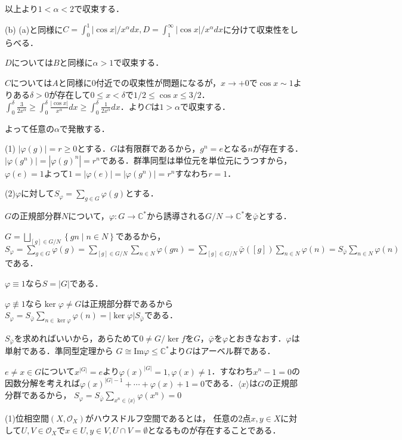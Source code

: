 \documentclass[
		book,
		head_space=20mm,
		foot_space=20mm,
		gutter=10mm,
		line_length=190mm
]{jlreq}
\begin{document}
以上より$1<\alpha<2$で収束する．

(b) (a)と同様に$C=\int_0^1 |\cos x|/x^\alpha dx,D=\int_1^\infty |\cos x|/x^\alpha dx$に分けて収束性をしらべる．

$D$については$B$と同様に$\alpha>1$で収束する．

$C$については$A$と同様に$0$付近での収束性が問題になるが，$x\to +0$で$\cos x \sim 1$よりある$\delta>0$が存在して$0\le x < \delta$で$1/2 \le \cos x \le 3/2$．
$\int_0^{\delta} \frac{3}{2x^{\alpha}}\ge \int_0^{\delta} \frac{|\cos x|}{x^{\alpha}} dx \ge \int_0^{\delta} \frac{1}{2x^{\alpha}} dx$．より$C$は$1>\alpha$で収束する．

よって任意の$\alpha$で発散する．

(1) $|\varphi(g)|=r\ge0$とする．$G$は有限群であるから，$g^n=e$となる$n$が存在する．$|\varphi(g^n)|=|\varphi(g)^n|=r^n$である．群準同型は単位元を単位元にうつすから，$\varphi(e)=1$よって$1=|\varphi(e)|=|\varphi(g^n)|=r^n$すなわち$r=1$．

(2)$\varphi$に対して$S_\varphi=\sum\limits_{g\in G} \varphi(g)$とする．

$G$の正規部分群$N$について，$\varphi\colon G \rightarrow \mathbb{C}^*$から誘導される$G/N \rightarrow \mathbb{C}^*$を$\bar{\varphi}$とする．


$G=\bigsqcup\limits_{[g]\in G/N} \left\{ gn \mid n\in N \right\}$であるから，$S_{\varphi}=\sum\limits_{g\in G} \varphi(g)=\sum\limits_{[g]\in G/N} \sum\limits_{n\in N} \varphi(gn)=\sum\limits_{[g]\in G/N} \bar{\varphi}([g])\sum\limits_{n\in N} \varphi(n)=S_{\bar{\varphi}}\sum\limits_{n\in N} \varphi(n)$である．

$\varphi\equiv1$なら$S=|G|$である．

$\varphi\not \equiv1$なら$\ker \varphi \neq G$は正規部分群であるから
$S_\varphi=S_{\bar{\varphi}}\sum\limits_{n\in\ker \varphi} \varphi(n)=|\ker \varphi|S_{\bar{\varphi}}$である．

$S_{\bar{\varphi}}$を求めればいいから，あらためて$0\neq G/\ker f$を$G$，$\bar{\varphi}$を$\varphi$とおきなおす．$\varphi$は単射である．準同型定理から
$G \cong \mathrm{Im}\varphi \le \mathbb{C}^*$より$G$はアーベル群である．

$e\neq x \in G$について$x^|G|=e$より$\varphi(x)^{|G|}=1,\varphi(x)\neq1$．すなわち$x^n-1=0$の因数分解を考えれば$\varphi(x)^{|G|-1}+\cdots+\varphi(x)+1=0$である．$\langle x \rangle$は$G$の正規部分群であるから，
$S_\varphi=S_{\bar{\varphi}}\sum\limits_{x^n\in \langle x \rangle} \varphi(x^n)=0$

(1)位相空間$(X,\mathcal{O}_X)$がハウスドルフ空間であるとは，
任意の2点$x,y\in X$に対して$U,V\in \mathcal{O}_X$で$x \in U,y\in V,U \cap V= \emptyset$となるものが存在することである．
\end{document}
